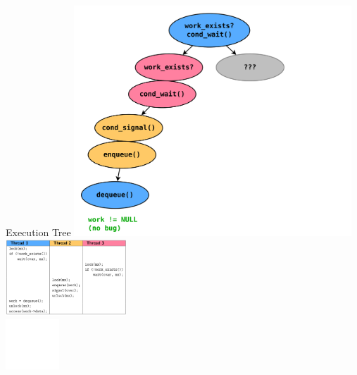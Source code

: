 \documentclass[xcolor=dvipsnames]{beamer}
\begin{document}
\begin{frame}{Execution Tree}
		\includegraphics[width=0.78\textwidth]{execution-tree-1.pdf} \\
		\vspace{-3in}
		\hspace{3in}
		\includegraphics[width=0.34\textwidth]{table-0.png}
		\\
		\vspace{1.2in}
		\hspace{3.7in}
		\includegraphics[width=0.15\textwidth]{frownie-blank.png}
\end{frame}
\end{document}
